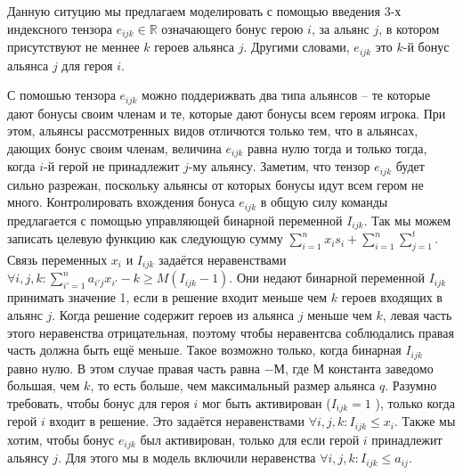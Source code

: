 \documentclass{article}
\begin{document}

Данную ситуцию мы предлагаем моделировать с помощью введения 3-х индексного тензора $e_{ijk} \in \mathbb{R}$ означающего бонус герою $i$, за альянс $j$, в котором присутствуют не меннее $k$ героев альянса $j$. Другими словами, $e_{ijk}$ это $k$-й бонус альянса $j$ для героя $i$.

С помошью тензора $e_{ijk}$ можно поддерижвать два типа альянсов – те которые дают бонусы своим членам и те, которые дают бонусы всем героям игрока. При этом, альянсы рассмотренных видов отличются только тем, что в альянсах, дающих бонус своим членам, величина $e_{ijk}$ равна нулю тогда и только тогда, когда $i$-й герой не принадлежит $j$-му альянсу. Заметим, что тензор  $e_{ijk}$  будет сильно разрежан, поскольку альянсы от которых бонусы идут всем гером не много.  
Контролировать вхождения бонуса $e_{ijk}$ в общую силу команды предлагается с помощью управляющей бинарной переменной $I_{ijk}$.
Так мы можем записать целевую функцию как следующую сумму $\sum_{i=1}^{n} x_i s_i + \sum_{i=1}^{n} \sum_{j=1}^{t} $.
Связь переменных $x_{i}$ и $I_{ijk}$ задаётся неравенствами
$\forall{i,j,k} :  \sum_{i'=1}^{n} a_{i'j} x_{i'} - k \ge M( I_{ijk}  - 1)$. 
Они недают бинарной переменной $I_{ijk}$ принимать значение 1, если в решение входит меньше чем $k$ героев входящих в альянс $j$. Когда решение содержит героев из альянса $j$ меньше чем $k$, левая часть этого неравенства отрицательная, поэтому чтобы неравентсва соблюдались правая часть должна быть ещё меньше. Такое возможно только, когда бинарная $I_{ijk}$ равно нулю. В этом случае правая часть равна $-М$, где $М$ константа заведомо большая, чем $k$, то есть больше, чем максимальный размер альянса $q$.
Разумно требовать, чтобы бонус для героя $i$ мог быть активирован ($I_{ijk} = 1$ ), только когда герой $i$ входит в решение. Это задаётся неравенствами $\forall{i,j,k} :  I_{ijk}  \le x_i$. Также мы хотим, чтобы бонус $e_{ijk}$ был активирован, только для если герой $i$ принадлежит альянсу $j$. Для этого мы в модель включили неравенства $\forall{i,j,k} :  I_{ijk}  \le a_{ij}$.   
\end{document}
